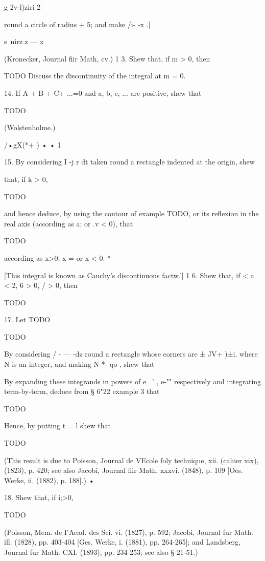 g 2v-l)ziri 2

round a circle of radius + 5; and make /i- -x .]

s\ nirz z — x

(Kronecker, Journal fiir Math, cv.) 1 3. Shew that, if m > 0, then

TODO
Discuss the discontinuity of the integral at m = 0.

14. If A + B + C+ ...=0 and a, b, c, ... are positive, shew that

TODO

(Wolstenholme.)

/•gX(*+ ) • • 1

15. By considering I -j r dt taken round a rectangle indented at the
origin, shew

that, if k > 0,

TODO

and hence deduce, by using the contour of  example TODO, or its
reflexion in the real axis (according as a; or .v < 0), that

TODO

according as x>0, x = or x < 0. *

[This integral is known as Cauchy's discontinuous factw.'] 1 6. Shew
that, if < a < 2, 6 > 0, / > 0, then

TODO

%
%

17. Let TODO

TODO

By considering / - — -dz round a rectangle whose corners are ± JV+
)±i, where N is an integer, and making N-*- qo , shew that

By expanding these integrands in powers of e~ ' , e-"" respectively
and integrating term-by-term, deduce from § 6"22 example 3 that

TODO

Hence, by putting t = l shew that

TODO

(This result is due to Poisson, Journal de VEcole foly technique, xii.
(cahier xix), (1823), p. 420; see also Jacobi, Journal fiir Math,
xxxvi. (1848), p. 109 [Oes. Werke, ii. (1882), p. 188].) •

18. Shew that, if i;>0,

TODO

(Poisson, Mem. de I'Acad. des Sci. vi. (1827), p. 592; Jacobi,
Journal fur Math. ill. (1828), pp. 403-404 [Ges. Werke, i. (1881), pp.
264-265]; and Landsberg, Journal fur Math. CXI. (1893), pp. 234-253;
see also § 21-51.)

